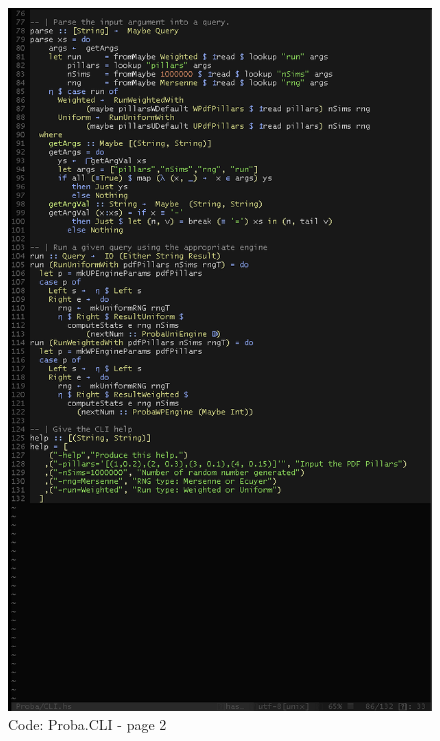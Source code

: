 \documentclass[12pt,a4paper,titlepage]{article}
\begin{document}
\begin{figure}[h!]
\centering
\includegraphics[width=1\textwidth]{img/code-cli-2.png}
\caption{Code: Proba.CLI - page 2}
\label{fig:core.cli2}
\end{figure}
\end{document}
